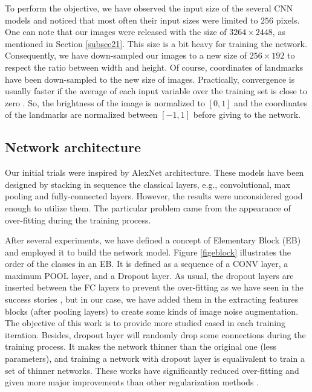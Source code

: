 \documentclass[review]{elsarticle}
\begin{document}
To perform the objective, we have observed the input size of the several CNN models \cite{krizhevsky2012imagenet, ciregan2012multi, cintas2016automatic, sun2013deep} and noticed that most often their input sizes were limited to $256$ pixels. One can note that our images were released with the size of $3264 \times 2448$, as mentioned in Section \ref{subsec21}. This size is a bit heavy for training the network. Consequently, we have down-sampled our images to a new size of $256 \times 192$ to respect the ratio between width and height. Of course, coordinates of landmarks have been down-sampled to the new size of images. Practically, convergence is usually faster if the average of each input variable over the training set is close to zero \cite{lecun2012efficient}. So, the brightness of the image is normalized to $[0,1]$ and the coordinates of the landmarks are normalized between $[-1,1]$ before giving to the network.

\subsection{Network architecture}
\label{subsec22}
Our initial trials were inspired by AlexNet architecture. These models have been designed by stacking in sequence the classical layers, e.g., convolutional, max pooling and fully-connected layers. However, the results were unconsidered good enough to utilize them. The particular problem came from the appearance of over-fitting during the training process.

After several experiments, we have defined a concept of Elementary Block (EB) and employed it to build the network model. Figure \ref{figeblock} illustrates the order of the classes in an EB. It is defined as a sequence of a CONV layer, a maximum POOL layer, and a Dropout layer. As usual, the dropout layers are inserted between the FC layers to prevent the over-fitting as we have seen in the success stories \cite{lecun2015deep, krizhevsky2012imagenet}, but in our case, we have added them in the extracting features blocks (after pooling layers) to create some kinds of image noise augmentation. The objective of this work is to provide more studied cased in each training iteration. Besides, dropout layer will randomly drop some connections during the training process. It makes the network thinner than the original one (less parameters), and training a network with dropout layer is equalivalent to train a set of thinner networks. These works have significantly reduced over-fitting and given more major improvements than other regularization methods \cite{srivastava2014dropout}.
\end{document}
